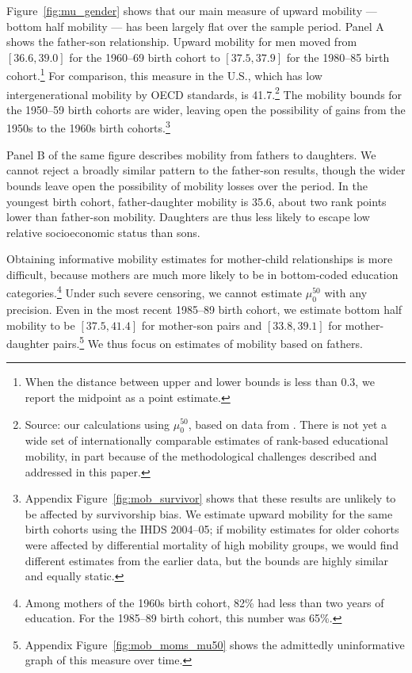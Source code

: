 \documentclass[12pt,letterpaper]{article}
\numberwithin{equation}{section}
\begin{document}
Figure~\ref{fig:mu_gender} shows that our main measure of upward mobility --- bottom half mobility --- has been largely flat over the sample period. Panel A shows the father-son relationship. Upward mobility for men moved from $[36.6, 39.0]$ for the 1960--69 birth cohort to $[37.5, 37.9]$ for the 1980--85 birth cohort.\footnote{When the distance between upper and lower bounds is less than 0.3, we report the midpoint as a point estimate.} For comparison, this measure in the U.S., which has low intergenerational mobility by OECD standards, is 41.7.\footnote{Source: our calculations using $\mu_0^{50}$, based on data from . There is not yet a wide set of internationally comparable estimates of rank-based educational mobility, in part because of the methodological challenges described and addressed in this paper.} The mobility bounds for the 1950--59 birth cohorts are wider, leaving open the possibility of gains from the 1950s to the 1960s birth cohorts.\footnote{Appendix Figure~\ref{fig:mob_survivor} shows that these results are unlikely to be affected by survivorship bias. We estimate upward mobility for the same birth cohorts using the IHDS 2004--05; if mobility estimates for older cohorts were affected by differential mortality of high mobility groups, we would find different estimates from the earlier data, but the bounds are highly similar and equally static.}

Panel B of the same figure describes mobility from fathers to daughters. We cannot reject a broadly similar pattern to the father-son results, though the wider bounds leave open the possibility of mobility losses over the period. In the youngest birth cohort, father-daughter mobility is 35.6, about two rank points lower than father-son mobility. Daughters are thus less likely to escape low relative socioeconomic status than sons.

Obtaining informative mobility estimates for mother-child relationships is more difficult, because mothers are much more likely to be in bottom-coded education categories.\footnote{Among mothers of the 1960s birth cohort, 82\% had less than two years of education. For the 1985--89 birth cohort, this number was 65\%.} Under such severe censoring, we cannot estimate $\mu_0^{50}$ with any precision. Even in the most recent 1985--89 birth cohort, we estimate bottom half mobility to be $[37.5, 41.4]$ for mother-son pairs and $[33.8, 39.1]$ for mother-daughter pairs.\footnote{Appendix Figure~\ref{fig:mob_moms_mu50} shows the admittedly uninformative graph of this measure over time.}  We thus focus on estimates of mobility based on fathers.
\end{document}
